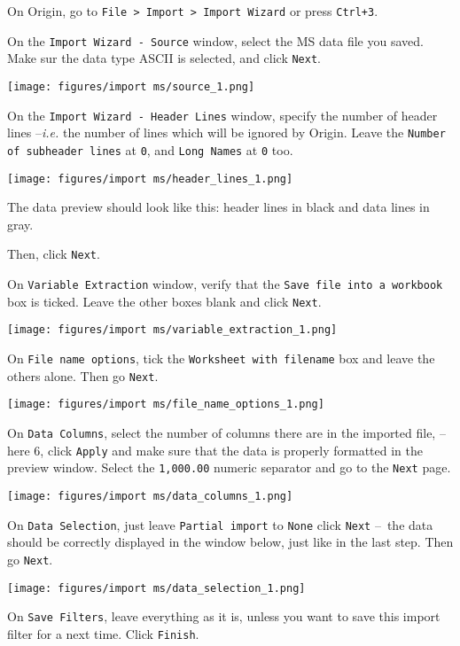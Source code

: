 \documentclass[a4paper, 11pt, raggedright, parskip]{tufte-style-article}
\begin{document}
\begin{ol}

\item On Origin, go to \texttt{File > Import > Import Wizard} or press \texttt{Ctrl+3}.

\item On the \texttt{Import Wizard - Source} window, select the MS data file you saved. Make sur the data type ASCII is selected, and click \texttt{Next}.

\texttt{[image: figures/import ms/source\_1.png]}

\item On the \texttt{Import Wizard - Header Lines} window, specify the number of header lines --\textit{i.e.} the number of lines which will be ignored by Origin. Leave the \texttt{Number of subheader lines} at \texttt{0}, and \texttt{Long Names} at \texttt{0} too.

\texttt{[image: figures/import ms/header\_lines\_1.png]}

The data preview should look like this: header lines in  black and data lines in gray.

Then, click \texttt{Next}.

\item On \texttt{Variable Extraction} window, verify that the \texttt{Save file into a workbook} box is ticked. Leave the other boxes blank and click \texttt{Next}. 

\texttt{[image: figures/import ms/variable\_extraction\_1.png]}

\item On \texttt{File name options}, tick the \texttt{Worksheet with filename} box and leave the others alone. Then go \texttt{Next}.

\texttt{[image: figures/import ms/file\_name\_options\_1.png]}

\item On \texttt{Data Columns}, select the number of columns there are in the imported file, -- here 6, click \texttt{Apply} and make sure that the data is properly formatted in the preview window. Select the \texttt{1,000.00} numeric separator and go to the \texttt{Next} page.

\texttt{[image: figures/import ms/data\_columns\_1.png]}

\item On \texttt{Data Selection}, just leave \texttt{Partial import} to \texttt{None} click \texttt{Next} --~the data should be correctly displayed in the window below, just like in the last step. Then go \texttt{Next}.

\texttt{[image: figures/import ms/data\_selection\_1.png]}

\item On \texttt{Save Filters}, leave everything as it is, unless you want to save this import filter for a next time. Click \texttt{Finish}.

\end{ol}
\end{document}
